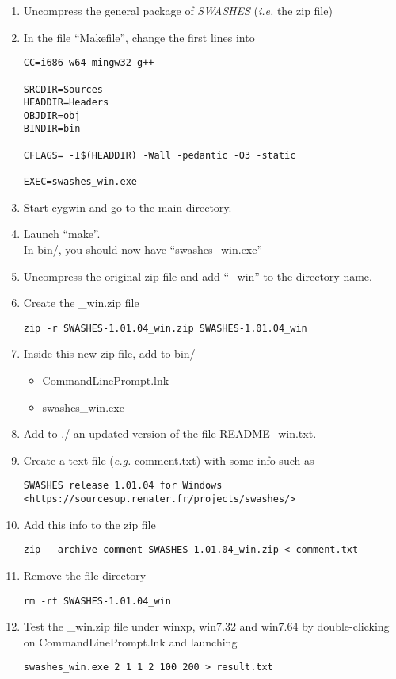 \documentclass[a4paper, 11pt]{article}
\newcommand{\SWASHES}{\emph{SWASHES}}
\begin{document}
\begin{enumerate}
\item Uncompress the general package of \SWASHES{} (\emph{i.e.} the zip file)
\item In the file ``Makefile'', change the first lines into
\begin{verbatim}
CC=i686-w64-mingw32-g++

SRCDIR=Sources
HEADDIR=Headers
OBJDIR=obj
BINDIR=bin

CFLAGS= -I$(HEADDIR) -Wall -pedantic -O3 -static

EXEC=swashes_win.exe
\end{verbatim}
\item Start cygwin and go to the main directory.
\item Launch ``make''.\\
In bin/, you should now have ``swashes\_win.exe''
\item Uncompress the original zip file and add ``\_win'' to the directory name.
\item Create the \_win.zip file
\begin{verbatim}
zip -r SWASHES-1.01.04_win.zip SWASHES-1.01.04_win
\end{verbatim}
\item Inside this new zip file, add to bin/
	\begin{itemize}
		\item CommandLinePrompt.lnk
		\item swashes\_win.exe
	\end{itemize}
\item Add to ./ an updated version of the file README\_win.txt.
\item Create a text file (\emph{e.g.} comment.txt) with some info such as
\begin{verbatim}
SWASHES release 1.01.04 for Windows
<https://sourcesup.renater.fr/projects/swashes/>
\end{verbatim}
\item Add this info to the zip file
\begin{verbatim}
zip --archive-comment SWASHES-1.01.04_win.zip < comment.txt
\end{verbatim}
\item Remove the file directory
\begin{verbatim}
rm -rf SWASHES-1.01.04_win
\end{verbatim}

\item Test the \_win.zip file under winxp, win7.32 and win7.64 by
double-clicking on CommandLinePrompt.lnk and launching
\begin{verbatim}
swashes_win.exe 2 1 1 2 100 200 > result.txt
\end{verbatim}
\end{enumerate}
\end{document}
